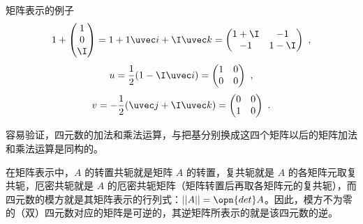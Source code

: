 \begin{example}{矩阵表示的例子}\label{ex_Quat_1}
\begin{equation}
1+\begin{pmatrix}1\\0\\\I\end{pmatrix} =1+1\uvec i+\I\uvec k =\begin{pmatrix}1+\I&-1\\-1&1-\I\end{pmatrix} ~,
\end{equation}
\begin{equation}
u=\frac{1}{2}(1-\I\uvec i)=\begin{pmatrix}1&0\\0&0\end{pmatrix} ~,
\end{equation}
\begin{equation}
v=-\frac{1}{2}(\uvec j+\I\uvec k)=\begin{pmatrix}0&0\\1&0\end{pmatrix} ~.
\end{equation}
\end{example}

容易验证，四元数的加法和乘法运算，与把基分别换成这四个矩阵以后的矩阵加法和乘法运算是同构的。

在矩阵表示中，$A$ 的转置共轭就是矩阵 $A$ 的转置，复共轭就是 $A$ 的各矩阵元取复共轭，厄密共轭就是 $A$ 的厄密共轭矩阵（矩阵转置后再取各矩阵元的复共轭），而四元数的模方就是其矩阵表示的行列式：$||A||=\opn{det}A$。因此，模方不为零的（双）四元数对应的矩阵是可逆的，其逆矩阵所表示的就是该四元数的逆。
